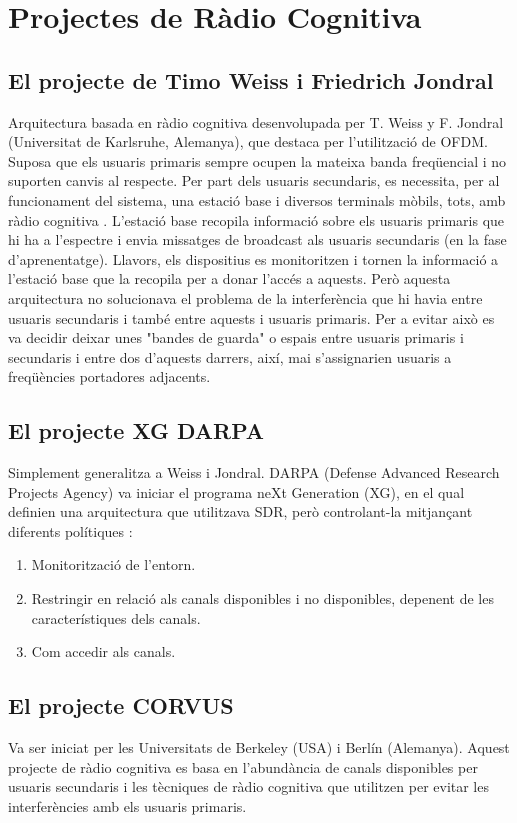 \documentclass[10pt,journal,a4paper]{IEEEtran}
\begin{document}
\section{Projectes de Ràdio Cognitiva}
\subsection{El projecte de Timo Weiss i Friedrich Jondral}
Arquitectura basada en ràdio cognitiva desenvolupada per T. Weiss y F. Jondral (Universitat de Karlsruhe, Alemanya), que destaca per l'utilització de OFDM.
Suposa que els usuaris primaris sempre ocupen la mateixa banda freqüencial i no suporten canvis al respecte.  Per part dels usuaris secundaris, es necessita, per al funcionament del sistema, una estació base i diversos terminals mòbils, tots, amb ràdio cognitiva \cite{Weiss_Jondral_2004}.
L'estació base recopila informació sobre els usuaris primaris que hi ha a l'espectre i envia missatges de broadcast als usuaris secundaris (en la fase d'aprenentatge).
Llavors, els dispositius es monitoritzen i tornen la informació a l'estació base que la recopila per a donar l'accés a aquests.
Però aquesta arquitectura no solucionava el problema de la interferència que hi havia entre usuaris secundaris i també entre aquests i usuaris primaris. Per a evitar això es va decidir deixar unes "bandes de guarda" o espais entre usuaris primaris i secundaris i entre dos d'aquests darrers, així, mai s'assignarien usuaris a freqüències portadores adjacents. \cite{Weiss_Jondral_2004}
\subsection{El projecte XG DARPA}
Simplement generalitza a Weiss i Jondral. DARPA (Defense Advanced
Research Projects Agency) va iniciar el programa neXt Generation (XG), en el qual definien una arquitectura que utilitzava SDR, però controlant-la mitjançant diferents polítiques \cite{Mchenry_2007}:
\begin{enumerate}
\item Monitorització de l'entorn.
\item Restringir en relació als canals disponibles i no disponibles, depenent de les característiques dels canals.
\item Com accedir als canals.
\end{enumerate}
\subsection{El projecte CORVUS}
Va ser iniciat per les Universitats de Berkeley (USA) i Berlín (Alemanya).
Aquest projecte de ràdio cognitiva es basa en l'abundància de canals disponibles per usuaris secundaris i les tècniques de ràdio cognitiva que utilitzen per evitar les interferències amb els usuaris primaris.
\end{document}
